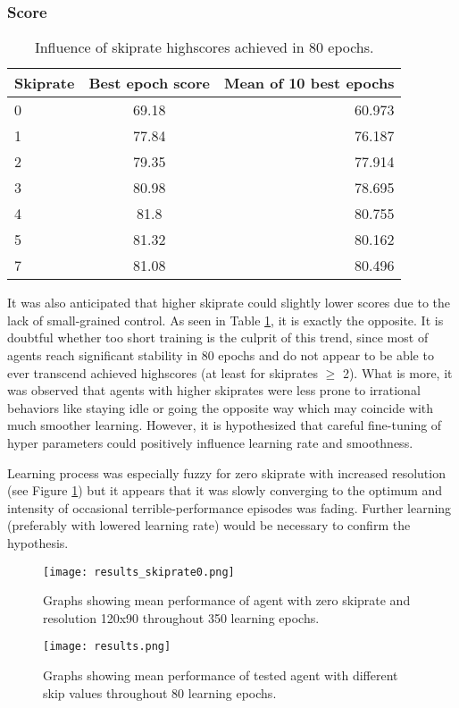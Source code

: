 		\subsubsection*{Score}
			\begin{table}
				\begin{center}
					\begin{tabular}{ |l || c | r |}
						\hline
						Skiprate & Best epoch score & Mean of 10 best epochs \\ \hline
						0 & 69.18 & 60.973 \\ \hline
						1 & 77.84 & 76.187 \\ \hline
						2 & 79.35 & 77.914 \\ \hline
						3 & 80.98 & 78.695 \\ \hline
						4 & 81.8 & 80.755 \\ \hline
						5 & 81.32 & 80.162 \\ \hline
						7 & 81.08 & 80.496 \\ \hline
					\end{tabular}
				\end{center}
				\caption{Influence of skiprate highscores achieved in 80 epochs.}\label{tab:results}
			\end{table}
			It was also anticipated that higher skiprate could slightly lower scores due to the lack of small-grained control. As seen in Table \ref{tab:results}, it is exactly the opposite. It is doubtful whether too short training is the culprit of this trend, since most of agents reach significant stability in 80 epochs and do not appear to be able to ever transcend achieved highscores (at least for skiprates $\geq$ 2). What is more, it was observed that agents with higher skiprates were less prone to irrational behaviors like staying idle or going the opposite way which may coincide with much smoother learning. However, it is hypothesized that careful fine-tuning of hyper parameters could positively influence learning rate and smoothness. 

			Learning process was especially fuzzy for zero skiprate with increased resolution (see Figure \ref{fig:results_skiprate0}) but it appears that it was slowly converging to the optimum and intensity of occasional terrible-performance episodes was fading. Further learning (preferably with lowered learning rate) would be necessary to confirm the hypothesis.
	
	\begin{figure}
		\centering
		\texttt{[image: results\_skiprate0.png]}
		\caption{Graphs showing mean performance of agent with zero skiprate and resolution 120x90 throughout 350 learning epochs.}\label{fig:results_skiprate0}
	\end{figure}

	\begin{figure}
		\centering
		\texttt{[image: results.png]}
		\caption{Graphs showing mean performance of tested agent with different skip values throughout 80 learning epochs.}\label{fig:results}
	\end{figure}
